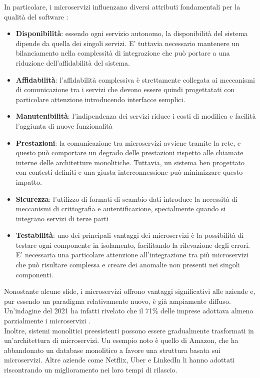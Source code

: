 In particolare, i microservizi influenzano diversi attributi fondamentali per la qualità del software \cite{dragoni2017}:
\begin{itemize}
    \item \textbf{Disponibilità}: essendo ogni servizio autonomo, la disponibilità del sistema dipende da quella dei singoli servizi. E' tuttavia necessario mantenere un bilanciamento nella complessità di integrazione che può portare a una riduzione dell'affidabilità del sistema.
    \item \textbf{Affidabilità}: l'affidabilità complessiva è strettamente collegata ai meccanismi di comunicazione tra i servizi che devono essere quindi progettatati con particolare attenzione introducendo interfacce semplici.
    \item \textbf{Manutenibilità}: l'indipendenza dei servizi riduce i costi di modifica e facilità l'aggiunta di nuove funzionalità
    \item \textbf{Prestazioni}: la comunicazione tra microservizi avviene tramite la rete, e questo può comportare un degrado delle prestazioni rispetto alle chiamate interne delle architetture monolitiche. Tuttavia, un sistema ben progettato con contesti definiti e una giusta interconnessione può minimizzare questo impatto.
    \item \textbf{Sicurezza}: l'utilizzo di formati di scambio dati introduce la necessità di meccanismi di crittografia e autentificazione, specialmente quando si integrano servizi di terze parti
    \item \textbf{Testabilità}: uno dei principali vantaggi dei microservizi è la possibilità di testare ogni componente in isolamento, facilitando la rilevazione degli errori. E' necessaria una particolare attenzione all'integrazione tra più microservizi che può risultare complessa e creare dei anomalie non presenti nei singoli componenti.
\end{itemize}
Nonostante alcune sfide, i microservizi offrono vantaggi significativi alle aziende e, pur essendo un paradigma relativamente nuovo,
è già ampiamente diffuso. 
Un'indagine del 2021 ha infatti rivelato che il 71\% delle imprese adottava almeno parzialmente i microservizi \cite{stat}.
\\Inoltre, sistemi monolitici preesistenti possono essere gradualmente trasformati in un'architettura di microservizi.
Un esempio noto è quello di Amazon, che ha abbandonato un database monolitico a favore una struttura basata sui microservizi.
Altre aziende come Netflix, Uber e LinkedIn li hanno adottati riscontrando un miglioramento nei loro tempi di rilascio.
